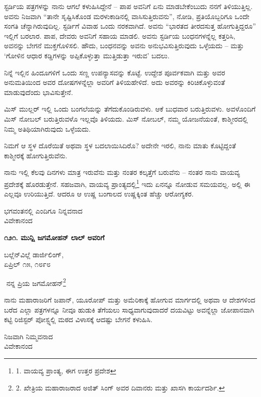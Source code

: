 ಸ್ಟರ್ಡಿಯ ಪತ್ರಗಳನ್ನು ನಾನು ಆಗಲೆ ಕಳುಹಿಸಿದ್ದೇನೆ – ಪಾಪ ಅವನಿಗೆ ಏನು ಮಾಡಬೇಕೆಂಬುದು ನನಗೆ ತಿಳಿಯುತ್ತಿಲ್ಲ. ಅವನು ನಿಜವಾಗಿ “ತಾನೇ ಸೃಷ್ಟಿಸಿಕೊಂಡ ಮರಳುಕಾಡಿನಲ್ಲಿ ವಾಸಿಸುತ್ತಿರುವನು”, ನೋಡಿ, ಪ್ರತಿಯೊಬ್ಬರಿಗೂ ಒಂದೇ ಸಂಗತಿ ಚೆನ್ನಾಗಿರುವುದಿಲ್ಲ. ಸ್ಟರ್ಡಿಗೆ ವಿವಾಹ ಒಂದು ನರಕವಾಗಿದೆ. ಅವನು “ಭಾರತದ ತೀರದಸುತ್ತ ಹೋಗುತ್ತಿದ್ದರೂ” ಇಲ್ಲಿಗೆ ಬರಲಾರ. ಪಾಪ, ದೇವರು ಅವನಿಗೆ ಸಹಾಯ ಮಾಡಲಿ. ಅವನು ಸ್ಟರ್ಡಿಯ ಬಂಧನಗಳನ್ನೆಲ್ಲ ಕತ್ತರಿಸಿ, ಅವನನ್ನು ಬೇಗನೆ ಮುಕ್ತಗೊಳಿಸಲಿ. ಹೌದು, ಬಂಧನವನ್ನು ಅವನು ಅನುಭವಿಸುತ್ತಿರುವುದು ಒಳ್ಳೆಯದು – ಮತ್ತು ‘ಗೋಳಿನ ಆಧಾರ ಕಡ್ಡಿಗಳನ್ನು ಅಪ್ಪಿಕೊಳ್ಳುತ್ತಾ ಮುತ್ತಿಡುತ್ತಾ ಇರುವ’ ಬದಲು.

ನಿನ್ನೆ ಇಲ್ಲಿನ ಹಿಂದೂಗಳಿಗೆ ಒಂದು ಸಣ್ಣ ಉಪನ್ಯಾಸವನ್ನು ಕೊಟ್ಟೆ. ಉದ್ದೇಶ ಪೂರ್ವಕವಾಗಿ ಮತ್ತು ಅವರ ಅನುಮತಿಯಿಂದ ಅವರ ದೋಷಗಳನ್ನೆಲ್ಲಾ ಅವರಿಗೆ ತಿಳಿಯಹೇಳಿದೆ. ಅದು ಅವರನ್ನು ಕಿರಿಚಿಕೊಳ್ಳುವಂತೆ ಮಾಡುವುದೆಂದು ಭಾವಿಸುತ್ತೇನೆ.

ಮಿಸ್ ಮುಲ್ಲರ್ ಇಲ್ಲಿ ಒಂದು ಬಂಗಲೆಯನ್ನು ತೆಗೆದುಕೊಂಡಿರುವಳು. ಆಕೆ ಬುಧವಾರ ಬರುತ್ತಿರುವಳು. ಅವಳೊಂದಿಗೆ ಮಿಸ್ ನೋಬಲ್ ಬರುತ್ತಿರುವಳೊ ಇಲ್ಲವೊ ತಿಳಿಯದು. ಮಿಸ್ ನೋಬಲ್, ನಮ್ಮ ಯೋಜನೆಯಂತೆ, ಕಾಶ್ಮೀರದಲ್ಲಿ ನಿಮ್ಮ ಅತಿಥಿಯಾಗಿರುವುದು ಒಳ್ಳೆಯದು.

ನಿಮಗೆ ಆ ಸ್ಥಳ ದೊರೆಯಿತೆ ಅಥವಾ ಸ್ಥಳ ಬದಲಾಯಿಸಿದಿರೊ? ಅದೇನೇ ಇರಲಿ, ನಾನು ಮಾತು ಕೊಟ್ಟಿದ್ದಂತೆ ಕಾಶ್ಮೀರಕ್ಕೆ ಹೋಗುತ್ತಿರುವೆನು.

ನಾನು ಇಲ್ಲಿ ಕೆಲವು ದಿನಗಳು ಮಾತ್ರ ಇರುವೆನು ಮತ್ತು ನಂತರ ಕಲ್ಕತ್ತೆಗೆ ಬರುವೆನು – ನಂತರ ನಾನು ವಾಯವ್ಯ ಪ್ರದೇಶಕ್ಕೆ ಹೊರಡುತ್ತೇನೆ. ಸಹಜವಾಗಿ, ವಾಯವ್ಯ ಪ್ರಾಂತ್ಯದಲ್ಲಿ\footnote{1. ವಾಯವ್ಯ ಪ್ರಾಂತ್ಯ, ಈಗ ಉತ್ತರ ಪ್ರದೇಶ} ಇದು ಏನನ್ನೂ ನೋಡುವ ಸಮಯವಲ್ಲ. ಅಲ್ಲಿ ಈ ಎಲ್ಲವೂ ಉರಿಯುತ್ತಿದೆ. ಆದರೂ ಆ ಉಷ್ಣ ಬಂಗಾಲದ ಉಷ್ಣಕ್ಕಿಂತ ಹೆಚ್ಚು ಆರೋಗ್ಯಕರ.

\begin{flushright}
ಭಗವಂತನಲ್ಲಿ ಎಂದಿಗೂ ನಿನ್ನವನಾದ\\ವಿವೇಕಾನಂದ
\end{flushright}

\begin{center}
\textbf{೧೨೧. ಮುನ್ಷಿ ಜಗಮೋಹನ್ ಲಾಲ್ ಅವರಿಗೆ}
\end{center}

\begin{flushright}
ಬಲ್ಲೆನ್‌ವಿಲ್ಲೆ ಡಾರ್ಜಿಲಿಂಗ್,\\ಏಪ್ರಿಲ್ ೧೫, ೧೮೯೮
\end{flushright}

‌
ನನ್ನ ಪ್ರಿಯ ಜಗಮೋಹನ್\footnote{2. ಖೇತ್ರಿಯ ಮಹಾರಾಜರಾದ ಅಜಿತ್ ಸಿಂಗ್ ಅವರ ದಿವಾನರು ಮತ್ತು ಖಾಸಗಿ ಕಾರ್ಯದರ್ಶಿ.}

ನಾನು ಮಹಾರಾಜರಿಗೆ ಜಪಾನ್, ಯೂರೋಪ್ ಮತ್ತು ಅಮೆರಿಕಾಕ್ಕೆ ಹೋಗುವ ಮಾರ್ಗದಲ್ಲಿ ಅಥವಾ ಆ ದೇಶಗಳಿಂದ ಬರೆದ ಎಲ್ಲಾ ಪತ್ರಗಳನ್ನೂ ನೀವೂ ಹುಡುಕಿ ತೆಗೆಯಲು ಸಾಧ್ಯವಾಗುವುದಾದರೆ ದಯವಿಟ್ಟು ಅವನ್ನೆಲ್ಲಾ ಜೋಪಾನವಾಗಿ ಕಟ್ಟಿ ರಿಜಿಸ್ಟರ್ ಪೋಸ್ಟ್ನಲ್ಲಿ ಮಠದ ವಿಳಾಸಕ್ಕೆ ಆದಷ್ಟು ಬೇಗನೆ ಕಳುಹಿಸಿ.

\begin{flushright}
ನಿಜವಾಗಿ ನಿಮ್ಮವನಾದ\\ವಿವೇಕಾನಂದ
\end{flushright}

